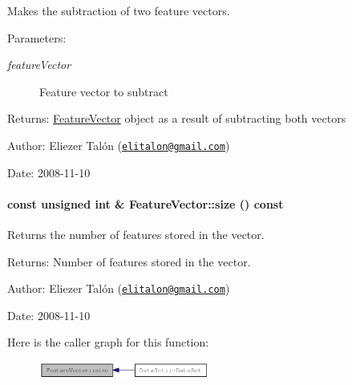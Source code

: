 Makes the subtraction of two feature vectors. 

\begin{Desc}
\item[Parameters:]
\begin{description}
\item[{\em featureVector}]Feature vector to subtract\end{description}
\end{Desc}
\begin{Desc}
\item[Returns:]\hyperlink{class_feature_vector}{FeatureVector} object as a result of subtracting both vectors\end{Desc}
\begin{Desc}
\item[Author:]Eliezer Talón (\href{mailto:elitalon@gmail.com}{\tt elitalon@gmail.com}) \end{Desc}
\begin{Desc}
\item[Date:]2008-11-10 \end{Desc}
\hypertarget{class_feature_vector_4e3bd39520fdd8afbefa90ed203d512b}{
\paragraph[{size}]{\setlength{\rightskip}{0pt plus 5cm}const unsigned int \& FeatureVector::size () const}\hfill}
\label{class_feature_vector_4e3bd39520fdd8afbefa90ed203d512b}


Returns the number of features stored in the vector. 

\begin{Desc}
\item[Returns:]Number of features stored in the vector.\end{Desc}
\begin{Desc}
\item[Author:]Eliezer Talón (\href{mailto:elitalon@gmail.com}{\tt elitalon@gmail.com}) \end{Desc}
\begin{Desc}
\item[Date:]2008-11-10 \end{Desc}


Here is the caller graph for this function:\nopagebreak
\begin{figure}[H]
\begin{center}
\leavevmode
\includegraphics[width=159pt]{class_feature_vector_4e3bd39520fdd8afbefa90ed203d512b_icgraph}
\end{center}
\end{figure}
